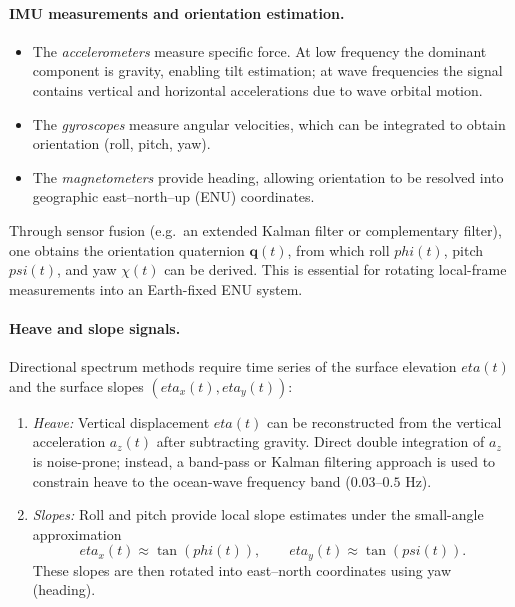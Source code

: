 \documentclass[journal,10pt,twocolumn]{IEEEtran}
\def\eta{eta}%
\def\phi{phi}%
\def\psi{psi}%
\begin{document}
    \paragraph{IMU measurements and orientation estimation.}
    \begin{itemize}[leftmargin=1.4em]
        \item The \emph{accelerometers} measure specific force. At low frequency the dominant component is gravity, enabling tilt estimation; at wave frequencies the signal contains vertical and horizontal accelerations due to wave orbital motion.
        \item The \emph{gyroscopes} measure angular velocities, which can be integrated to obtain orientation (roll, pitch, yaw).
        \item The \emph{magnetometers} provide heading, allowing orientation to be resolved into geographic east--north--up (ENU) coordinates.
    \end{itemize}
    Through sensor fusion (e.g.\ an extended Kalman filter or complementary filter), one obtains the orientation quaternion $\mathbf{q}(t)$, from which roll $\phi(t)$, pitch $\psi(t)$, and yaw $\chi(t)$ can be derived. This is essential for rotating local-frame measurements into an Earth-fixed ENU system.

    \paragraph{Heave and slope signals.}
    Directional spectrum methods require time series of the surface elevation $\eta(t)$ and the surface slopes $(\eta_x(t),\eta_y(t))$:
    \begin{enumerate}[leftmargin=1.5em]
        \item \emph{Heave:} Vertical displacement $\eta(t)$ can be reconstructed from the vertical acceleration $a_z(t)$ after subtracting gravity. Direct double integration of $a_z$ is noise-prone; instead, a band-pass or Kalman filtering approach is used to constrain heave to the ocean-wave frequency band ($0.03$--$0.5$ Hz).
        \item \emph{Slopes:} Roll and pitch provide local slope estimates under the small-angle approximation
        \begin{equation}
            \eta_x(t) \approx \tan(\phi(t)), \qquad \eta_y(t) \approx \tan(\psi(t)).
        \end{equation}
        These slopes are then rotated into east--north coordinates using yaw (heading).
    \end{enumerate}
\end{document}
